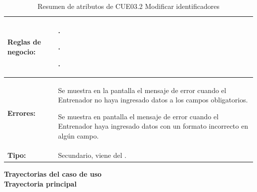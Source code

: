 \begin{table}[H]
\begin{tabular}{| l | p{12 cm} |}
\hline
\textbf{Reglas de negocio:} & \vspace{-2mm}	%
							\begin{compactitem}
								\item \nameref{rn:RNR01}.
								\item \nameref{rn:RNR14}.
								\item \nameref{rn:RNR15}.
							\end{compactitem}\\						
\hline
\textbf{Errores:} &	\vspace{-2mm}	%
					\begin{compactitem}
						\setlength\itemsep{-0.25em}
							\item Se muestra en la pantalla \nameref{pant:IUE03.2} el mensaje de error \nameref{msj:MSG12} cuando el Entrenador no haya ingresado datos a los campos obligatorios.
							\item Se muestra en pantalla el mensaje de error \nameref{msj:MSG13} cuando el Entrenador haya ingresado datos con un formato incorrecto en algún campo.
						\end{compactitem}\\
\hline
\textbf{Tipo:} & Secundario, viene del \nameref{cu:CUE03}.\\
\hline	
\end{tabular}
\caption{Resumen de atributos de CUE03.2 Modificar identificadores}
\label{tab:CUE03.2}
\end{table} 

\clearpage
\textbf{\textcolor[rgb]{0, 0, 0.545098}{Trayectorias del caso de uso}} \\

\textbf{\large{Trayectoria principal}}

